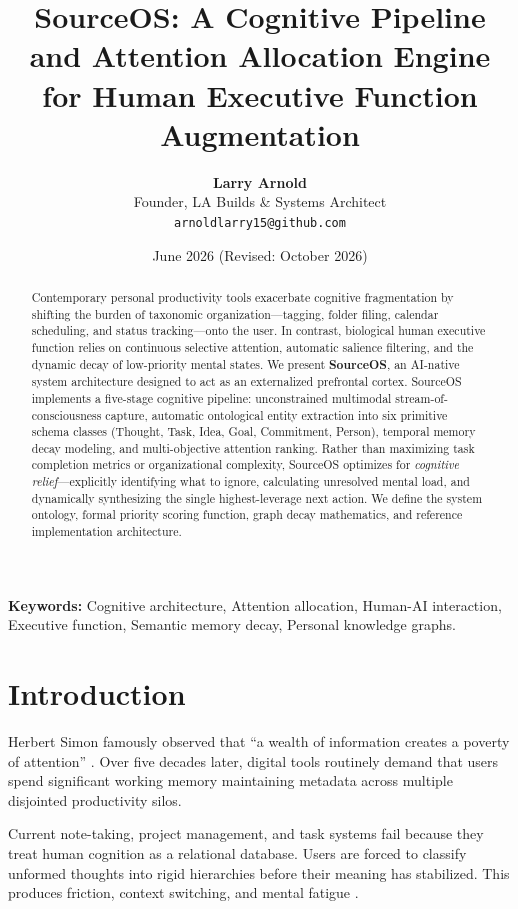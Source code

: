 \documentclass[11pt,a4paper]{article}
\title{\textbf{SourceOS: A Cognitive Pipeline and Attention Allocation Engine\\for Human Executive Function Augmentation}}
\author{
    \textbf{Larry Arnold}\\
    Founder, LA Builds \& Systems Architect\\
    \texttt{arnoldlarry15@github.com}
}
\date{June 2026 (Revised: October 2026)}
\begin{document}
\maketitle

\begin{abstract}
Contemporary personal productivity tools exacerbate cognitive fragmentation by shifting the burden of taxonomic organization---tagging, folder filing, calendar scheduling, and status tracking---onto the user. In contrast, biological human executive function relies on continuous selective attention, automatic salience filtering, and the dynamic decay of low-priority mental states. We present \textbf{SourceOS}, an AI-native system architecture designed to act as an externalized prefrontal cortex. SourceOS implements a five-stage cognitive pipeline: unconstrained multimodal stream-of-consciousness capture, automatic ontological entity extraction into six primitive schema classes (Thought, Task, Idea, Goal, Commitment, Person), temporal memory decay modeling, and multi-objective attention ranking. Rather than maximizing task completion metrics or organizational complexity, SourceOS optimizes for \textit{cognitive relief}---explicitly identifying what to ignore, calculating unresolved mental load, and dynamically synthesizing the single highest-leverage next action. We define the system ontology, formal priority scoring function, graph decay mathematics, and reference implementation architecture.
\end{abstract}

\vspace{1em}
\noindent \textbf{Keywords:} Cognitive architecture, Attention allocation, Human-AI interaction, Executive function, Semantic memory decay, Personal knowledge graphs.

\section{Introduction}
Herbert Simon famously observed that ``a wealth of information creates a poverty of attention'' \cite{simon1971designing}. Over five decades later, digital tools routinely demand that users spend significant working memory maintaining metadata across multiple disjointed productivity silos. 

Current note-taking, project management, and task systems fail because they treat human cognition as a relational database. Users are forced to classify unformed thoughts into rigid hierarchies before their meaning has stabilized. This produces friction, context switching, and mental fatigue \cite{sweller1988cognitive, baddeley1992working}.
\end{document}
